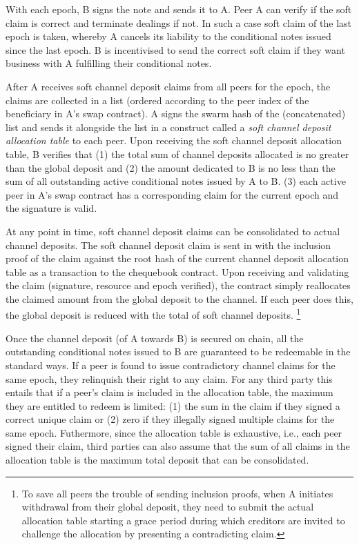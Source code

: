\documentclass[a4paper,10pt]{article}
\newcommand\gloss[1]{\emph{\gls{#1}}}
\begin{document}
With each epoch, B signs the note and sends it to A.
Peer A can verify if the soft claim is correct and terminate dealings if not. In such a case soft claim of
the last epoch is taken, whereby A cancels its liability to the conditional notes issued since
the last epoch.
B is incentivised to send the correct soft claim if they want business with A fulfilling their
conditional notes.

After A receives soft channel deposit claims from all peers for the epoch, the claims are
collected in a list (ordered according to the peer index of the beneficiary in A's swap contract).
A signs the swarm hash of the (concatenated) list and sends it alongside the list
in a construct called a \gloss{soft channel deposit allocation table} to each peer.
Upon receiving the soft channel deposit allocation table, B verifies that
(1) the total sum of channel deposits allocated is no greater than the global deposit and
(2) the amount dedicated to B is no less than the sum of all outstanding active
conditional notes issued by A to B.
(3) each active peer in A's swap contract has a corresponding claim for the current epoch and the signature is valid.

At any point in time, soft channel deposit claims can be consolidated to actual
channel deposits.
The soft channel deposit claim is sent in with the inclusion proof of the claim against the root hash of the
current channel deposit allocation table as a transaction to the
chequebook contract. Upon receiving and validating the claim (signature, resource and epoch verified),
the contract simply reallocates the claimed amount from the global deposit to the channel.
If each peer does this, the global deposit is reduced with the total of soft channel
deposits.%
%
\footnote{To save all peers the trouble of sending inclusion proofs, when A initiates withdrawal from
their global deposit, they need to submit the actual allocation table starting a grace period during which
creditors are invited to challenge the allocation by presenting a contradicting claim.}

Once the channel deposit (of A towards B) is secured on chain, all the outstanding conditional notes
issued to B are guaranteed to be redeemable in the standard ways.
If a peer is found to issue contradictory channel claims for the same epoch, they relinquish
their right to any claim. For any third party this entails that if a peer's claim is
included in the allocation table, the maximum they are entitled to redeem is limited:
(1) the sum in the claim if they signed a correct unique claim or
(2) zero if they illegally signed multiple claims for the same epoch.
Futhermore, since the allocation table is exhaustive, i.e., each
peer signed their claim, third parties can also assume that the sum of all claims in the
allocation table is the maximum total deposit that can be consolidated.
\end{document}

